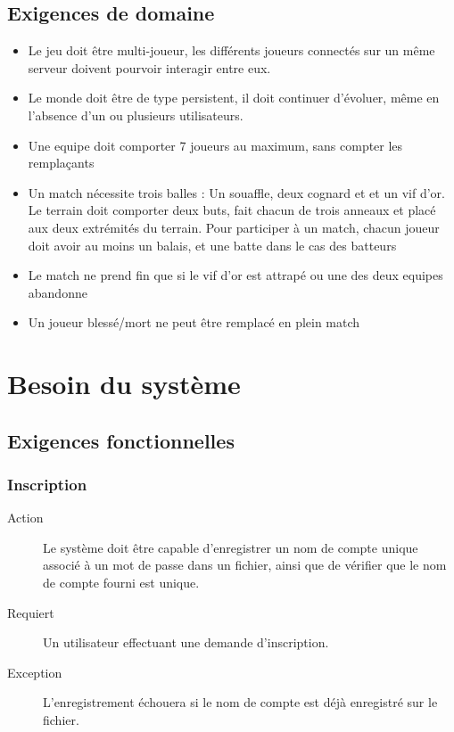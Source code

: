 \documentclass[a4paper]{article}
\begin{document}
\subsection{Exigences de domaine}
\begin{itemize}
\item Le jeu doit être multi-joueur, les différents joueurs connectés sur un même \gls{serveur} doivent pourvoir interagir entre eux. %
\item Le monde doit être de type persistent, il doit continuer d'évoluer, même en l'absence d'un ou plusieurs \glspl{utilisateur}.
\item Une \gls{equipe} doit comporter 7 \glspl{joueur} au maximum, sans compter les remplaçants
\item Un match nécessite trois balles : Un souaffle, deux cognard et  et un vif d'or. Le terrain doit comporter deux buts, fait chacun de trois anneaux et placé aux deux extrémités du terrain. Pour participer à un match, chacun \gls{joueur} doit avoir au moins un balais, et une batte dans le cas des batteurs
\item Le match ne prend fin que si le vif d'or est attrapé ou une des deux \glspl{equipe} abandonne
\item Un \gls{joueur} blessé/mort ne peut être remplacé en plein match 
\end{itemize}


\section{Besoin du système}
\subsection{Exigences fonctionnelles}

\subsubsection{Inscription}
\begin{description}
\item[Action] Le système doit être capable d'enregistrer un nom de compte unique associé à un mot de passe dans un fichier, ainsi que de vérifier que le nom de compte fourni est unique.
\item[Requiert] Un \gls{utilisateur} effectuant une demande d'inscription.
\item[Exception] L'enregistrement échouera si le nom de compte est déjà enregistré sur le fichier.
\end{description}
\end{document}
